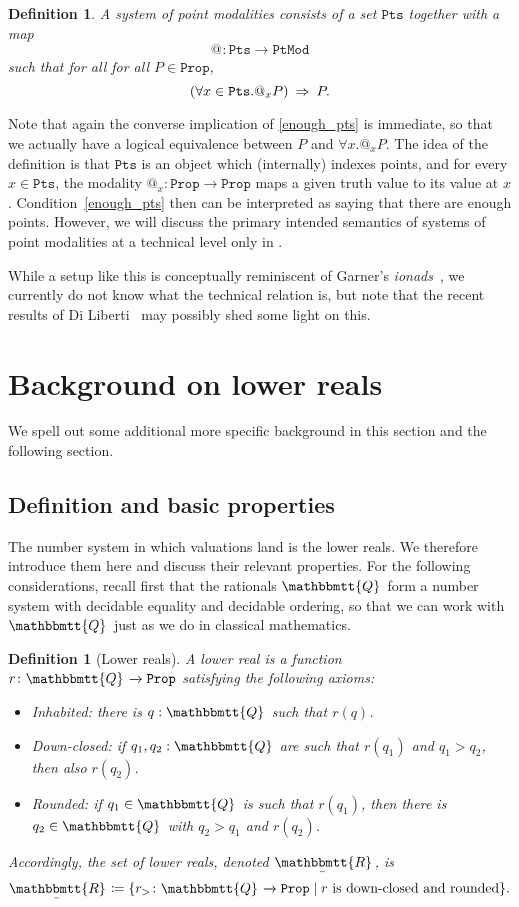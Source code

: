 \documentclass[reqno,11pt]{amsproc}
\makeatletter
\theoremstyle{plain}
\newtheorem{definition}[theorem]{Definition}
\theoremstyle{definition}
\newcommand{\Const}[1]{\mathtt{#1}}
\renewcommand{\to}[1][]{\xrightarrow{#1}}
\newcommand{\ubar}[1]{\underaccent{\bar}{#1}}
\newcommand{\internal}[1]{\raisebox{-.03ex}{$\mathbbmtt{#1}$}}
\newcommand{\hs}{\hspace{1pt}}
\newcommand{\tqq}{\internal{Q}\hs}
\newcommand{\trr}{\internal{R}}
\newcommand{\tlrr}{\ubar{\trr}\hs}
\newcommand{\prop}{\Const{Prop}}
\newcommand{\pt}{x}
\newcommand{\pts}{\mathtt{Pts}}		%
\newcommand{\ptmod}{\mathtt{PtMod}}	%
\newcommand{\atsymbol}{{@}}
\newcommand{\at}[1][\pt]{\atsymbol_{#1}}
\let\originalleft\left
\let\originalright\right
\renewcommand{\left}{\mathopen{}\mathclose\bgroup\originalleft}
\renewcommand{\right}{\aftergroup\egroup\originalright}
\newcommand{\beq}{\begin{equation}}
\newcommand{\eeq}{\end{equation}}
\numberwithin{equation}{section}
\makeatother
\begin{document}
\begin{definition}
	\label{system_defn}
	A \emph{system of point modalities} consists of a set $\pts$ together with a map
	\[
		\at[] \colon \pts \to \ptmod		
	\]
	such that for all for all $P \in \prop$,
	\beq
		\label{enough_pts}
		\left( \forall \pt \in \pts . \at P \right) \: \Rightarrow \: P.
	\eeq
\end{definition}

Note that again the converse implication of \eqref{enough_pts} is immediate, so that we actually have a logical equivalence between $P$ and $\forall \pt . \at P$. The idea of the definition is that $\pts$ is an object which (internally) indexes points, and for every $\pt \in \pts$, the modality $\at : \prop \to \prop$ maps a given truth value to its value at $\pt$. Condition~\eqref{enough_pts} then can be interpreted as saying that there are enough points.
However, we will discuss the primary intended semantics of systems of point modalities at a technical level only in .

While a setup like this is conceptually reminiscent of Garner's \emph{ionads}~\cite{garner2012ionads}, we currently do not know what the technical relation is, but note that the recent results of Di Liberti~\cite{diliberti2020topology} may possibly shed some light on this.

\section{Background on lower reals}

We spell out some additional more specific background in this section and the following section.

\subsection{Definition and basic properties}

The number system in which valuations land is the lower reals. We therefore introduce them here and discuss their relevant properties. For the following considerations, recall first that the rationals $\tqq$ form a number system with decidable equality and decidable ordering, so that we can work with $\tqq$ just as we do in classical mathematics.

\begin{definition}[Lower reals]\label{def.lower_nn_reals}
A \emph{lower real} is a function $r\colon\tqq\to\prop$ satisfying the following axioms:%
\begin{itemize}
	\item Inhabited: there is $q:\tqq$ such that $r(q)$.
	\item Down-closed: if $q_1,q_2:\tqq$ are such that $r(q_1)$ and $q_1 > q_2$, then also $r(q_2)$.
	\item Rounded: if $q_1 \in \tqq$ is such that $r(q_1)$, then there is $q_2 \in \tqq$ with $q_2 > q_1$ and $r(q_2)$.
\end{itemize}
Accordingly, the set of lower reals, denoted $\tlrr$, is
\[
	\tlrr\coloneqq\{r_>\colon\tqq\to\prop\mid r \textrm{ is down-closed and rounded}\}.
\]
\end{definition}
\end{document}
